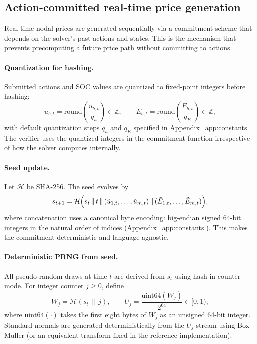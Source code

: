 \documentclass[11pt]{article}
\begin{document}
\subsection{Action-committed real-time price generation}
Real-time nodal prices are generated sequentially via a commitment scheme that depends on the solver's past actions and states. This is the mechanism that prevents precomputing a future price path without committing to actions.

\paragraph{Quantization for hashing.}
Submitted actions and SOC values are quantized to fixed-point integers before hashing:
\[
\tilde{u}_{b,t}=\mathrm{round}\!\left(\frac{u_{b,t}}{q_u}\right)\in\mathbb{Z},
\qquad
\tilde{E}_{b,t}=\mathrm{round}\!\left(\frac{E_{b,t}}{q_E}\right)\in\mathbb{Z},
\]
with default quantization steps $q_u$ and $q_E$ specified in Appendix~\ref{app:constants}. The verifier uses the quantized integers in the commitment function irrespective of how the solver computes internally.

\paragraph{Seed update.}
Let $\mathcal{H}$ be SHA-256. The seed evolves by
\begin{equation}\label{eq:seed}
s_{t+1}=\mathcal{H}\Bigl(s_t \,\|\, t \,\|\, (\tilde{u}_{1,t},\dots,\tilde{u}_{m,t}) \,\|\, (\tilde{E}_{1,t},\dots,\tilde{E}_{m,t})\Bigr),
\end{equation}
where concatenation uses a canonical byte encoding: big-endian signed 64-bit integers in the natural order of indices (Appendix~\ref{app:constants}). This makes the commitment deterministic and language-agnostic.

\paragraph{Deterministic PRNG from seed.}
All pseudo-random draws at time $t$ are derived from $s_t$ using hash-in-counter-mode. For integer counter $j\ge 0$, define
\[
W_j=\mathcal{H}(s_t\,\|\,j),
\qquad
U_j=\frac{\mathrm{uint64}(W_j)}{2^{64}}\in[0,1),
\]
where $\mathrm{uint64}(\cdot)$ takes the first eight bytes of $W_j$ as an unsigned 64-bit integer. Standard normals are generated deterministically from the $U_j$ stream using Box--Muller (or an equivalent transform fixed in the reference implementation).
\end{document}

